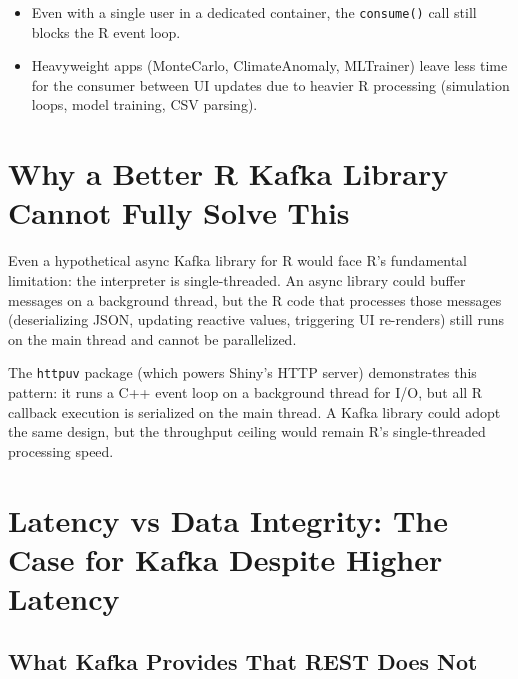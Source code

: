 \documentclass[11pt,a4paper]{article}
\begin{document}
\begin{itemize}
  \item Even with a single user in a dedicated container, the
        \texttt{consume()} call still blocks the R event loop.
  \item Heavyweight apps (MonteCarlo, ClimateAnomaly, MLTrainer) leave
        less time for the consumer between UI updates due to heavier
        R processing (simulation loops, model training, CSV parsing).
\end{itemize}

\section{Why a Better R Kafka Library Cannot Fully Solve This}

Even a hypothetical async Kafka library for R would face R's fundamental
limitation: the interpreter is single-threaded. An async library could
buffer messages on a background thread, but the R code that processes
those messages (deserializing JSON, updating reactive values, triggering
UI re-renders) still runs on the main thread and cannot be parallelized.

The \texttt{httpuv} package (which powers Shiny's HTTP server) demonstrates
this pattern: it runs a C++ event loop on a background thread for I/O,
but all R callback execution is serialized on the main thread. A Kafka
library could adopt the same design, but the throughput ceiling would
remain R's single-threaded processing speed.

\section{Latency vs Data Integrity: The Case for Kafka Despite Higher Latency}

\subsection{What Kafka Provides That REST Does Not}
\end{document}
